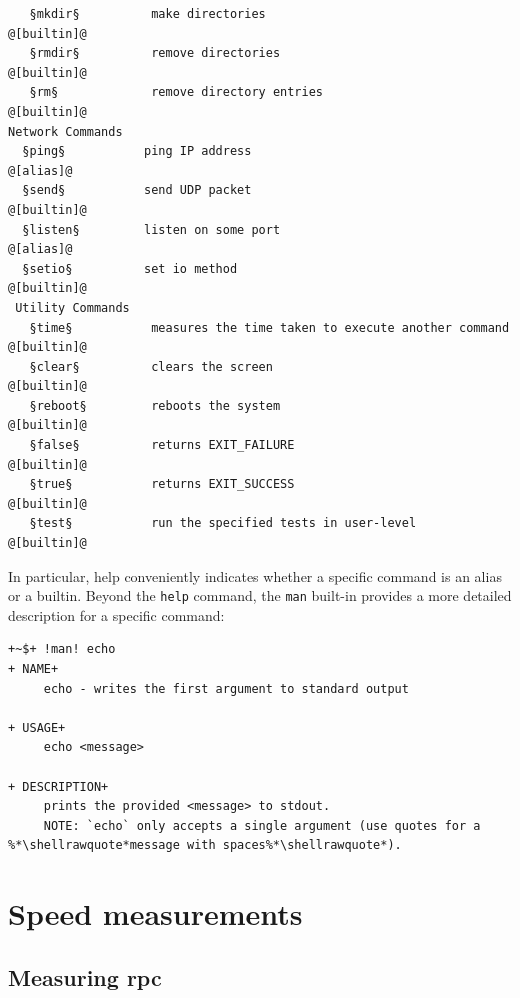 \begin{lstlisting}
   §mkdir§          make directories                                     @[builtin]@
   §rmdir§          remove directories                                   @[builtin]@
   §rm§             remove directory entries                             @[builtin]@
Network Commands
  §ping§           ping IP address                                       @[alias]@
  §send§           send UDP packet                                       @[builtin]@
  §listen§         listen on some port                                   @[alias]@
  §setio§          set io method                                         @[builtin]@
 Utility Commands
   §time§           measures the time taken to execute another command   @[builtin]@
   §clear§          clears the screen                                    @[builtin]@
   §reboot§         reboots the system                                   @[builtin]@
   §false§          returns EXIT_FAILURE                                 @[builtin]@
   §true§           returns EXIT_SUCCESS                                 @[builtin]@
   §test§           run the specified tests in user-level                @[builtin]@
\end{lstlisting}

In particular, help conveniently indicates whether a specific command is an alias or a builtin. Beyond the \texttt{help} command, the \texttt{man} built-in provides a more detailed description for a specific command:
\begin{lstlisting}[style=ShellInputStyle, deletekeywords={run, command, wc, echo, builtin, alias, return, in, ps, kill, help, exit, pwd, cd, cat, tee, time, false, true, test, for}, basicstyle=\tiny\ttfamily\color{shell_default}]
 +~$+ !man! echo
+ NAME+
     echo - writes the first argument to standard output

+ USAGE+
     echo <message>

+ DESCRIPTION+
     prints the provided <message> to stdout.
     NOTE: `echo` only accepts a single argument (use quotes for a %*\shellrawquote*message with spaces%*\shellrawquote*).
\end{lstlisting}

\endgroup

\begingroup
\renewcommand\thechapter{B}
{\normalfont\huge\bfseries}{}{}{\Huge}

\chapter{Speed measurements}

\section{Measuring rpc}

